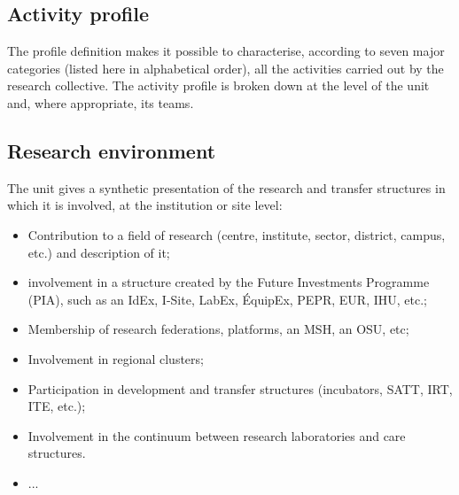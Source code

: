 \subsection{Activity profile}

\begin{hceresinstructions}
  The profile definition makes it possible to characterise, according to
  seven major categories (listed here in alphabetical order), all the
  activities carried out by the research collective. The activity profile
  is broken down at the level of the unit and, where appropriate, its
  teams.
\end{hceresinstructions}


\subsection{Research environment}

\begin{hceresinstructions}
  The unit gives a synthetic presentation of the research and transfer
  structures in which it is involved, at the institution or site level:

  \begin{itemize}
  \item Contribution to a field of research (centre, institute, sector,
  district, campus, etc.) and description of it;

  \item involvement in a structure created by the Future Investments Programme
  (PIA), such as an IdEx, I-Site, LabEx, ÉquipEx, PEPR, EUR, IHU, etc.;

  \item Membership of research federations, platforms, an MSH, an OSU, etc;

  \item Involvement in regional clusters;

  \item Participation in development and transfer structures (incubators,
      SATT, IRT, ITE, etc.);

  \item Involvement in the continuum between research laboratories and care
  structures.

  \item ...
  \end{itemize}
\end{hceresinstructions}

